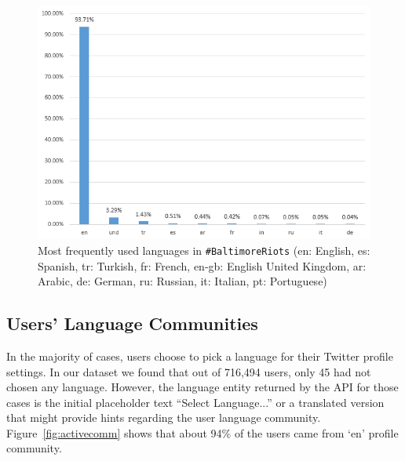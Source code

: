 \documentclass[conference]{IEEEtran}
\begin{document}
\begin{figure}[!htb]
\centering
\includegraphics[width=\columnwidth]{images/langfreq.png}
\caption{Most frequently used languages in {\texttt{\#BaltimoreRiots}}
  (en: English, es: Spanish, tr: Turkish, fr: French, en-gb: English
  United Kingdom, ar: Arabic, de: German, ru: Russian, it: Italian,
  pt: Portuguese)}
\label{fig:langfreq}
\end{figure}


\subsection{Users' Language Communities}

In the majority of cases, users choose to pick a language for their
Twitter profile settings. In our dataset we found that out of 716,494
users, only 45 had not chosen any language. However, the language
entity returned by the API for those cases is the initial placeholder
text ``Select Language...'' or a translated version that might provide
hints regarding the user language
community. Figure~\ref{fig:activecomm} shows that about 94\% of the
users came from `en' profile community.
\end{document}
